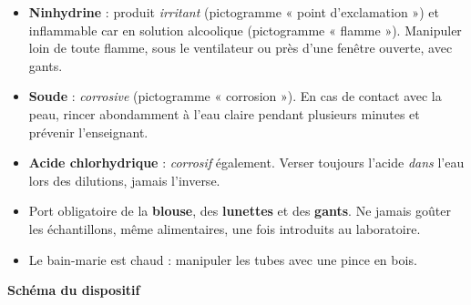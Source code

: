 \documentclass[11pt]{article}
\begin{document}
\begin{attention}
\begin{itemize}
\item \textbf{Ninhydrine} : produit \emph{irritant} (pictogramme « point d'exclamation ») et inflammable car en solution alcoolique (pictogramme « flamme »). Manipuler loin de toute flamme, sous le ventilateur ou près d'une fenêtre ouverte, avec gants.
\item \textbf{Soude } : \emph{corrosive} (pictogramme « corrosion »). En cas de contact avec la peau, rincer abondamment à l'eau claire pendant plusieurs minutes et prévenir l'enseignant.
\item \textbf{Acide chlorhydrique } : \emph{corrosif} également. Verser toujours l'acide \emph{dans} l'eau lors des dilutions, jamais l'inverse.
\item Port obligatoire de la \textbf{blouse}, des \textbf{lunettes} et des \textbf{gants}. Ne jamais goûter les échantillons, même alimentaires, une fois introduits au laboratoire.
\item Le bain-marie est chaud : manipuler les tubes avec une pince en bois.
\end{itemize}
\end{attention}

\textbf{Schéma du dispositif}\par
\end{document}
